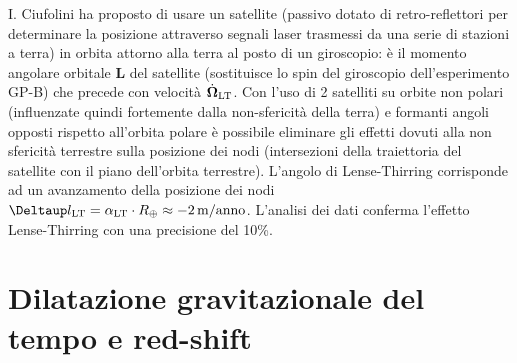 I. Ciufolini ha proposto di usare un satellite (passivo dotato di
retro-reflettori per determinare la posizione attraverso segnali laser trasmessi
da una serie di stazioni a terra) in orbita attorno alla terra al posto di un
giroscopio: è il momento angolare orbitale $\bm{L}$ del satellite (sostituisce
lo spin del giroscopio dell'esperimento GP-B) che precede con velocità
$\dot{\bm{\Omega}}_{\textup{LT}}$.  Con l'uso di 2 satelliti su orbite non
polari (influenzate quindi fortemente dalla non-sfericità della terra) e
formanti angoli opposti rispetto all'orbita polare è possibile eliminare gli
effetti dovuti alla non sfericità terrestre sulla posizione dei nodi
(intersezioni della traiettoria del satellite con il piano dell'orbita
terrestre).  L'angolo di Lense-Thirring corrisponde ad un avanzamento della
posizione dei nodi
$\var l_{\textup{LT}} = \alpha_{\textup{LT}} \cdot R_{\oplus} \approx
-\SI{2}{\metre/anno}$.
L'analisi dei dati conferma l'effetto Lense-Thirring con una precisione del
10\%.

\section{Dilatazione gravitazionale del tempo e red-shift}
\label{sec:red-shift-gravitazionale}

